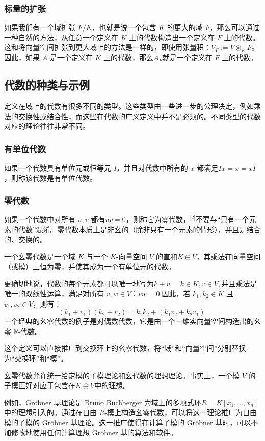 \subsubsection{标量的扩张}
如果我们有一个域扩张 $F/K$，也就是说一个包含 $K$ 的更大的域 $F$，那么可以通过一种自然的方法，从任意一个定义在 $K$ 上的代数构造出一个定义在 $F$ 上的代数。这和将向量空间扩张到更大域上的方法是一样的，即使用张量积：$V_F := V \otimes_K F
$。因此，如果 $A$ 是一个定义在 $K$ 上的代数，那么$A_F$就是一个定义在 $F$ 上的代数。
\subsection{代数的种类与示例}
定义在域上的代数有很多不同的类型。这些类型由一些进一步的公理决定，例如乘法的交换性或结合性，而这些在代数的广义定义中并不是必须的。不同类型的代数对应的理论往往非常不同。
\subsubsection{有单位代数}
如果一个代数具有单位元或恒等元 $I$，并且对代数中所有的 $x$ 都满足$I x = x = x I$，则称该代数是有单位代数。
\subsubsection{零代数}
如果一个代数中对所有 $u, v$ 都有$uv = 0$，则称它为零代数，\(^\text{[2]}\)不要与“只有一个元素的代数”混淆。零代数本质上是非幺的（除非只有一个元素的情形），并且是结合的、交换的。

一个幺零代数是一个域 $K$ 与一个 $K$-向量空间 $V$ 的直和$K \oplus V$，其乘法在向量空间（或模）上恒为零，并使其成为一个有单位元的代数。

更确切地说，代数的每个元素都可以唯一地写为$k + v, \quad k \in K, v \in V,$并且乘法是唯一的双线性运算，满足对所有 $v, w \in V$：$vw = 0$.因此，若 $k_1, k_2 \in K$ 且 $v_1, v_2 \in V$，则有：
$$
(k_1 + v_1)(k_2 + v_2) = k_1k_2 + (k_1v_2 + k_2v_1)~
$$
一个经典的幺零代数的例子是对偶数代数，它是由一个一维实向量空间构造出的幺零 $\mathbb{R}$-代数。

这个定义可以直接推广到交换环上的幺零代数，将“域”和“向量空间”分别替换为“交换环”和“模”。

幺零代数允许统一给定模的子模理论和幺代数的理想理论。事实上，一个模 $V$ 的子模正好对应于包含在$K \oplus V$中的理想。

例如，Gröbner 基理论是 Bruno Buchberger 为域上的多项式环$R = K[x_1,\dots, x_n]$中的理想引入的。通过在自由 $R$-模上构造幺零代数，可以将这一理论推广为自由模的子模的 Gröbner 基理论。这一推广使得在计算子模的 Gröbner 基时，可以不加修改地使用任何计算理想 Gröbner 基的算法和软件。

